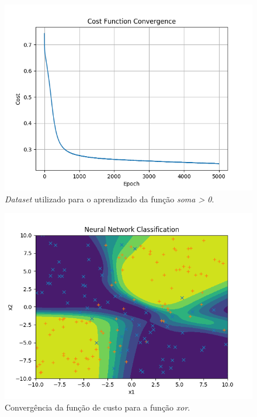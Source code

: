 \documentclass[conference]{IEEEtran}
\begin{document}
\begin{figure}[htbp]
\centering
\centerline{\includegraphics[scale=0.5]{imagens/xor/lambda_zero/convergence_xor.png}}
\caption{\textit{Dataset} utilizado para o aprendizado da função \textit{soma > 0}.}
\label{xor/lambda_zero/convergence_xor}
\end{figure}

\begin{figure}[htbp]
\centering
\centerline{\includegraphics[scale=0.5]{imagens/xor/lambda_zero/nn_classification_xor.png}}
\caption{Convergência da função de custo para a função \textit{xor}.}
\label{xor/lambda_zero/nn_classification_xor}
\end{figure}
\end{document}
